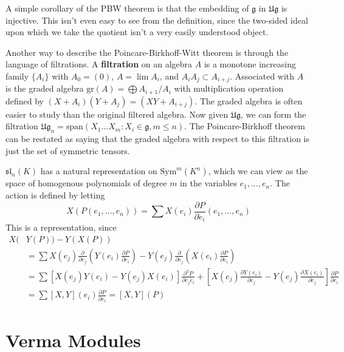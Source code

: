 A simple corollary of the PBW theorem is that the embedding of $\mathfrak{g}$ in $\mathfrak{Ug}$ is injective. This isn't even easy to see from the definition, since the two-sided ideal upon which we take the quotient isn't a very easily understood object.

Another way to describe the Poincare-Birkhoff-Witt theorem is through the language of filtrations. A {\bf filtration} on an algebra $A$ is a monotone increasing family $\{ A_i \}$ with $A_0 = (0)$, $A = \lim A_i$, and $A_i A_j \subset A_{i + j}$. Associated with $A$ is the graded algebra $\text{gr}(A) = \bigoplus A_{i+1}/A_i$ with multiplication operation defined by $(X + A_i)(Y + A_j) = (XY + A_{i+j})$. The graded algebra is often easier to study than the original filtered algebra. Now given $\mathfrak{Ug}$, we can form the filtration $\mathfrak{Ug}_n = \text{span}(X_1 \dots X_m : X_i \in \mathfrak{g}, m \leq n)$. The Poincare-Birkhoff theorem can be restated as saying that the graded algebra with respect to this filtration is just the set of symmetric tensors.

\begin{example}
    $\mathfrak{sl}_n(K)$ has a natural representation on $\text{Sym}^m(K^n)$, which we can view as the space of homogenous polynomials of degree $m$ in the variables $e_1, \dots, e_n$. The action is defined by letting
    \[ X\left( P(e_1, \dots, e_n) \right) = \sum X(e_i) \frac{\partial P}{\partial e_i}(e_1, \dots, e_n) \]
    This is a representation, since
    \begin{align*}
        X(&Y(P)) - Y(X(P))\\
        &= \sum X(e_j) \frac{\partial}{\partial e_j} \left( Y(e_i) \frac{\partial P}{\partial e_i} \right) - Y(e_j) \frac{\partial}{\partial e_j} \left( X(e_i) \frac{\partial P}{\partial e_i} \right)\\
        &= \sum [X(e_j) Y(e_i) - Y(e_j) X(e_i)] \frac{\partial^2 P}{\partial e_j e_i} + \left[ X(e_j) \frac{\partial Y(e_i)}{\partial e_j} - Y(e_j) \frac{\partial X(e_i)}{\partial e_j} \right] \frac{\partial P}{\partial e_i}\\
        &= \sum [X,Y](e_i) \frac{\partial P}{\partial e_i} = [X,Y](P)
    \end{align*}
\end{example}

\section{Verma Modules}

